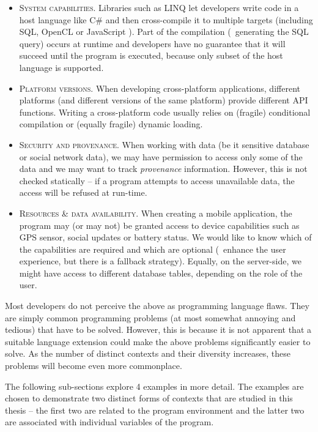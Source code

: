\begin{itemize}
\item \textsc{System capabilities.} Libraries such as LINQ \cite{app-linq} let developers write code
  in a host language like C\# and then cross-compile it to multiple targets (including SQL, OpenCL
  or JavaScript \cite{app-hop-lang}). Part of the compilation (\eg~generating the SQL query) occurs
  at runtime and developers have no guarantee that it will succeed until the program is executed,
  because only subset of the host language is supported.

\item \textsc{Platform versions.} When developing cross-platform applications, different platforms
  (and different versions of the same platform) provide different API functions. Writing a
  cross-platform code usually relies on (fragile) conditional compilation or (equally fragile)
  dynamic loading.

\item \textsc{Security and provenance.} When working with data (be it sensitive database or social
   network data), we may have permission to access only some of the data and we may want to track
   \emph{provenance} information. However, this is not checked statically -- if a program attempts
   to access unavailable data, the access will be refused at run-time.

\item \textsc{Resources \& data availability.} When creating a mobile application, the program may
  (or may not) be granted access to device capabilities such as GPS sensor, social updates or battery
  status. We would like to know which of the capabilities are required and which are optional
  (\ie~enhance the user experience, but there is a fallback strategy). Equally, on the server-side,
  we might have access to different database tables, depending on the role of the user.
\end{itemize}

\noindent
Most developers do not perceive the above as programming language flaws. They are simply common
programming problems (at most somewhat annoying and tedious) that have to be solved. However, this
is because it is not apparent that a suitable language extension could make the above problems
significantly easier to solve. As the number of distinct contexts and their diversity increases,
these problems will become even more commonplace.

The following sub-sections explore 4 examples in more detail. The examples are chosen to
demonstrate two distinct forms of contexts that are studied in this thesis -- the first two are
related to the program environment and the latter two are associated with individual variables of
the program.

